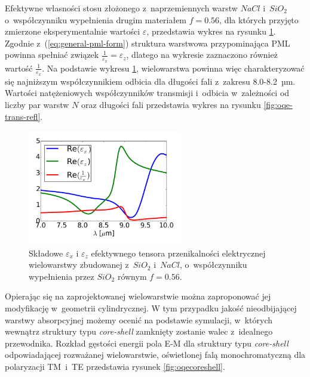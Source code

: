 Efektywne własności stosu złożonego z~naprzemiennych warstw $NaCl$ i~$SiO_2$ o~współczynniku wypełnienia drugim materiałem $f=0.56$, dla których przyjęto zmierzone eksperymentalnie wartości $\varepsilon$, przedstawia wykres na rysunku \ref{fig:eff-pml-real}. Zgodnie z~(\ref{eq:general-pml-form}) struktura warstwowa przypominająca PML powinna spełniać związek $\frac{1}{\varepsilon_x}=\varepsilon_z$, dlatego na wykresie zaznaczono również wartość $\frac{1}{\varepsilon_x}$. Na podstawie wykresu \ref{fig:eff-pml-real}, wielowarstwa powinna więc charakteryzować się najniższym współczynnikiem odbicia dla długości fali z~zakresu 8.0-8.2~µm. Wartości natężeniowych współczynników transmisji i~odbicia w~zależności od liczby par warstw $N$ oraz długości fali przedstawia wykres na rysunku \ref{fig:oqe-trans-refl}.

\begin{figure}
	\includegraphics[width=0.6\textwidth]{images/pml/effepsilon-nacl-sio2.png}
	\caption{Składowe $\varepsilon_x$ i $\varepsilon_z$ efektywnego tensora przenikalności elektrycznej wielowarstwy zbudowanej z~$SiO_2$ i~$NaCl$, o~współczynniku wypełnienia przez $SiO_2$ równym $f=0.56$.}
	\label{fig:eff-pml-real}
\end{figure}

Opierając się na zaprojektowanej wielowarstwie można zaproponować jej modyfikację w~geometrii cylindrycznej. W tym przypadku jakość nieodbijającej warstwy absorpcyjnej możemy ocenić na podstawie symulacji, w~których wewnątrz struktury typu \textit{core-shell} zamknięty zostanie walec z~idealnego przewodnika. Rozkład gęstości energii pola E-M dla struktury typu \textit{core-shell} odpowiadającej rozważanej wielowarstwie, oświetlonej falą monochromatyczną dla polaryzacji TM~i~TE przedstawia rysunek \ref{fig:oqecoreshell}.


